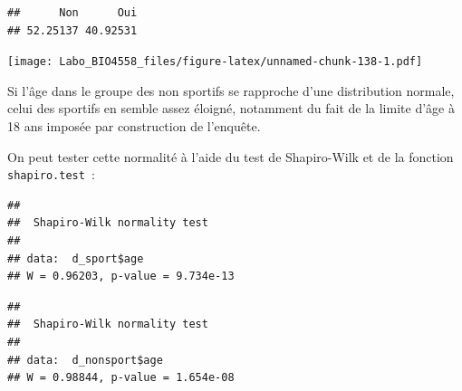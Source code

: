 \documentclass[12pt,]{book}
\newenvironment{Shaded}{\begin{snugshade}}{\end{snugshade}}
\newcommand{\KeywordTok}[1]{\textcolor[rgb]{0.27,0.27,0.27}{\textbf{#1}}}
\newcommand{\NormalTok}[1]{#1}
\newcommand{\OperatorTok}[1]{\textcolor[rgb]{0.43,0.43,0.43}{\textbf{#1}}}
\begin{document}
\begin{Shaded}
\end{Shaded}

\begin{verbatim}
##      Non      Oui 
## 52.25137 40.92531
\end{verbatim}

\begin{Shaded}
\end{Shaded}

\texttt{[image: Labo\_BIO4558\_files/figure-latex/unnamed-chunk-138-1.pdf]}

Si l'âge dans le groupe des non sportifs se rapproche d'une distribution normale, celui des sportifs en semble assez éloigné, notamment du fait de la limite d'âge à 18 ans imposée par construction de l'enquête.

On peut tester cette normalité à l'aide du test de Shapiro-Wilk et de la fonction \texttt{shapiro.test}~:

\begin{Shaded}
\end{Shaded}

\begin{verbatim}
## 
## 	Shapiro-Wilk normality test
## 
## data:  d_sport$age
## W = 0.96203, p-value = 9.734e-13
\end{verbatim}

\begin{Shaded}
\end{Shaded}

\begin{verbatim}
## 
## 	Shapiro-Wilk normality test
## 
## data:  d_nonsport$age
## W = 0.98844, p-value = 1.654e-08
\end{verbatim}
\end{document}
